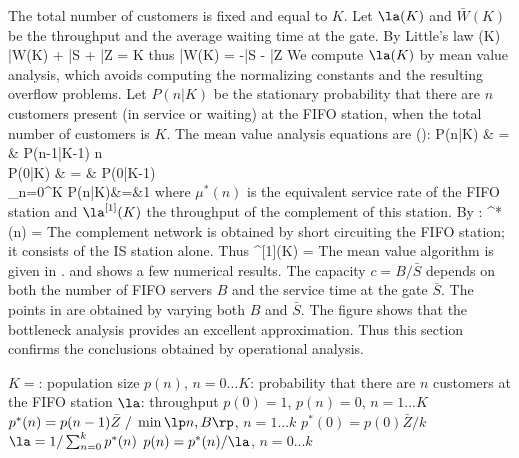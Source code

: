 The total number of customers is fixed and equal
to $K$. Let $\la(K)$ and $\bar{W}(K)$ be the
throughput and the average waiting time at the
gate. By Little's law
 \ben
 \la(K) \lp \bar{W}(K) + \bar{S} + \bar{Z} \rp = K
 \een
 thus
 \be
 \bar{W}(K) = -\bar{S} - \bar{Z}
 \ee
We compute $\la(K)$ by mean value analysis, which
avoids computing the normalizing constants and
the resulting overflow problems. Let $P(n|K)$ be
the stationary probability that there are $n$
customers present (in service or waiting) at the
FIFO station, when the total number of customers
is $K$. The mean value analysis equations are
():
 \bear
 P(n|K) & = &  P(n-1|K-1)
 \mif n \label{eq-qnet-dklfsjfdkl1}
 \\
 P(0|K) & = & P(0|K-1)
 \label{eq-qnet-dklfsjfdkl2}
 \\
\sum_{n=0}^K P(n|K)&=&1
\label{eq-qnet-dklfsjfdkl3}
 \eear
 where $\mu^*(n)$ is the equivalent service
rate of the FIFO station and $\la^{[1]}(K)$ the
throughput of the complement of this station. By
:
 \ben
 \mu^*(n) =  
  \een
The complement network is obtained by short
circuiting the FIFO station; it consists of the
IS station alone. Thus
 \ben
 \la^{[1]}(K) = 
 \een
The mean value algorithm is given in
.  and
 shows a few
numerical results. The capacity $c=B/\bar{S}$
depends on both the number of FIFO servers $B$
and the service time at the gate $\bar{S}$. The
points in  are obtained by
varying both $B$ and $\bar{S}$. The figure shows
that the bottleneck analysis provides an
excellent approximation. Thus this section
confirms the conclusions obtained by operational
analysis.
 \begin{algorithm}
 \begin{algorithmic}[1]
%
  \State $K=$: population size
  \State $p(n)$, $n=0...K$: probability
  that there are $n$ customers at the FIFO
  station
  \State $\la$: throughput
  \State $p(0)=1$, $p(n)=0$, $n=1...K$
     \State $p^*(n) = p(n-1) \bar{Z} \;/\; \min\lp n
     ,B\rp$,
     $n=1...k$
     \State $p^*(0) = p(0) \bar{Z}/ k$
     \State $\la= 1 / \sum_{n=0}^k p^*(n)$
     \State $p(n)=p^*(n)/\la$, $n=0...k$
  \EndFor
\end{algorithmic}\label{algo-q-mva-cs}
 \end{algorithm}
